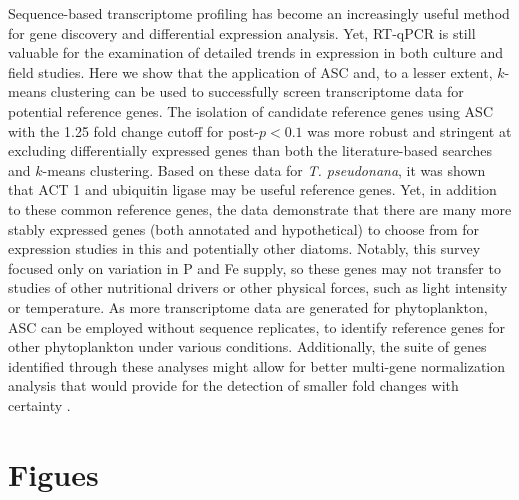 	Sequence-based transcriptome profiling has become an increasingly useful method for gene discovery and differential expression analysis. Yet, RT-qPCR is still valuable for the examination of detailed trends in expression in both culture and field studies. Here we show that the application of ASC and, to a lesser extent, $k$-means clustering can be used to successfully screen transcriptome data for potential reference genes. The isolation of candidate reference genes using ASC with the 1.25 fold change cutoff for post-$p < 0.1$ was more robust and stringent at excluding differentially expressed genes than both the literature-based searches and $k$-means clustering. Based on these data for \textit{T. pseudonana}, it was shown that ACT 1 and ubiquitin ligase may be useful reference genes. Yet, in addition to these common reference genes, the data demonstrate that there are many more stably expressed genes (both annotated and hypothetical) to choose from for expression studies in this and potentially other diatoms. Notably, this survey focused only on variation in P and Fe supply, so these genes may not transfer to studies of other nutritional drivers or other physical forces, such as light intensity or temperature. As more transcriptome data are generated for phytoplankton, ASC can be employed without sequence replicates, to identify reference genes for other phytoplankton under various conditions. Additionally, the suite of genes identified through these analyses might allow for better multi-gene normalization analysis that would provide for the detection of smaller fold changes with certainty \citep{Vandesompele2002, Czechowski2005}.\par

\section{Figues}








